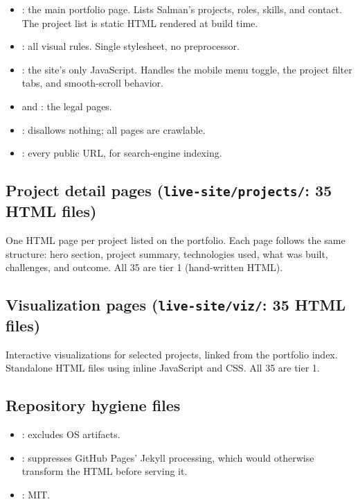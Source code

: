 \documentclass[11pt,a4paper]{article}
\begin{document}
\begin{itemize}
  \item {}: the main portfolio page. Lists Salman's
    projects, roles, skills, and contact. The project list is static HTML
    rendered at build time.
  \item {}: all visual rules. Single stylesheet,
    no preprocessor.
  \item {}: the site's only JavaScript. Handles the
    mobile menu toggle, the project filter tabs, and smooth-scroll behavior.
  \item {} and :
    the legal pages.
  \item {}: disallows nothing; all pages are crawlable.
  \item {}: every public URL, for search-engine indexing.
\end{itemize}

\subsection*{Project detail pages (\texttt{live-site/projects/}: 35 HTML files)}

One HTML page per project listed on the portfolio. Each page follows the same
structure: hero section, project summary, technologies used, what was built,
challenges, and outcome. All 35 are tier 1 (hand-written HTML).

\subsection*{Visualization pages (\texttt{live-site/viz/}: 35 HTML files)}

Interactive visualizations for selected projects, linked from the portfolio
index. Standalone HTML files using inline JavaScript and CSS. All 35 are tier 1.

\subsection*{Repository hygiene files}

\begin{itemize}
  \item {}: excludes OS artifacts.
  \item {}: suppresses GitHub Pages' Jekyll processing,
    which would otherwise transform the HTML before serving it.
  \item {}: MIT.
\end{itemize}
\end{document}
